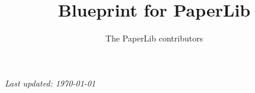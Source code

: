 \documentclass[a4paper]{report}
\title{Blueprint for PaperLib}
\author{The PaperLib contributors}
\begin{document}
\maketitle
\noindent\textit{Last updated: \today}\par
\vspace{1ex}
\tableofcontents



\end{document}
